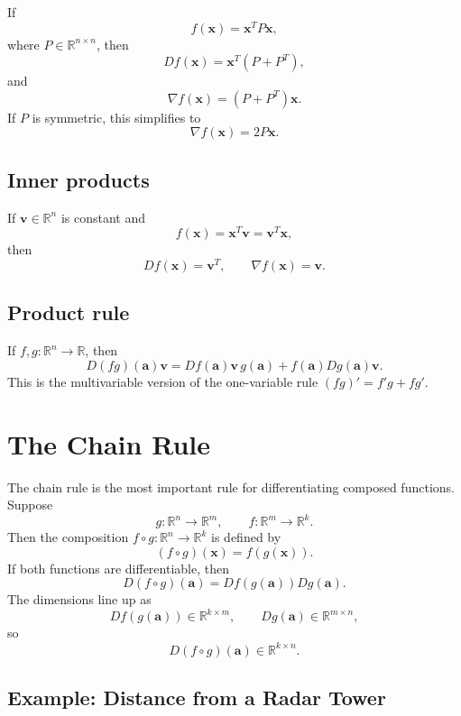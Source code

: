 If
\[
    f(\mathbf{x})=\mathbf{x}^T P\mathbf{x},
\]
where \(P\in\mathbb{R}^{n\times n}\), then
\[
    Df(\mathbf{x})=\mathbf{x}^T(P+P^T),
\]
and
\[
    \nabla f(\mathbf{x})=(P+P^T)\mathbf{x}.
\]
If \(P\) is symmetric, this simplifies to
\[
    \nabla f(\mathbf{x})=2P\mathbf{x}.
\]

\subsection*{Inner products}

If \(\mathbf{v}\in\mathbb{R}^n\) is constant and
\[
    f(\mathbf{x})=\mathbf{x}^T\mathbf{v}=\mathbf{v}^T\mathbf{x},
\]
then
\[
    Df(\mathbf{x})=\mathbf{v}^T,
    \qquad
    \nabla f(\mathbf{x})=\mathbf{v}.
\]

\subsection*{Product rule}

If \(f,g:\mathbb{R}^n\to\mathbb{R}\), then
\[
    D(fg)(\mathbf{a})\mathbf{v}
    =Df(\mathbf{a})\mathbf{v}\,g(\mathbf{a})
    +f(\mathbf{a})Dg(\mathbf{a})\mathbf{v}.
\]
This is the multivariable version of the one-variable rule \((fg)'=f'g+fg'\).

\section{The Chain Rule}
\label{mf:chain-rule}

The chain rule is the most important rule for differentiating composed functions. Suppose
\[
    g:\mathbb{R}^n\to\mathbb{R}^m,
    \qquad
    f:\mathbb{R}^m\to\mathbb{R}^k.
\]
Then the composition \(f\circ g:\mathbb{R}^n\to\mathbb{R}^k\) is defined by
\[
    (f\circ g)(\mathbf{x})=f(g(\mathbf{x})).
\]
If both functions are differentiable, then
\[
    D(f\circ g)(\mathbf{a})=Df(g(\mathbf{a}))Dg(\mathbf{a}).
\]
The dimensions line up as
\[
    Df(g(\mathbf{a}))\in\mathbb{R}^{k\times m},
    \qquad
    Dg(\mathbf{a})\in\mathbb{R}^{m\times n},
\]
so
\[
    D(f\circ g)(\mathbf{a})\in\mathbb{R}^{k\times n}.
\]

\subsection*{Example: Distance from a Radar Tower}

